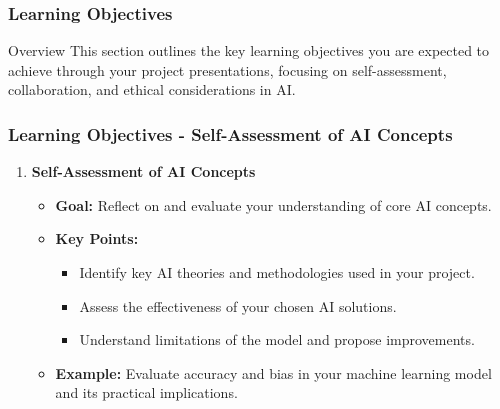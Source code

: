 \documentclass[aspectratio=169]{beamer}
\begin{document}
\begin{frame}[fragile]
    \frametitle{Learning Objectives}
    \begin{block}{Overview}
        This section outlines the key learning objectives you are expected to achieve through your project presentations, focusing on self-assessment, collaboration, and ethical considerations in AI.
    \end{block}
\end{frame}

\begin{frame}[fragile]
    \frametitle{Learning Objectives - Self-Assessment of AI Concepts}
    \begin{enumerate}
        \item \textbf{Self-Assessment of AI Concepts}
        \begin{itemize}
            \item \textbf{Goal:} Reflect on and evaluate your understanding of core AI concepts.
            \item \textbf{Key Points:}
                \begin{itemize}
                    \item Identify key AI theories and methodologies used in your project.
                    \item Assess the effectiveness of your chosen AI solutions.
                    \item Understand limitations of the model and propose improvements.
                \end{itemize}
            \item \textbf{Example:} Evaluate accuracy and bias in your machine learning model and its practical implications.
        \end{itemize}
    \end{enumerate}
\end{frame}
\end{document}
